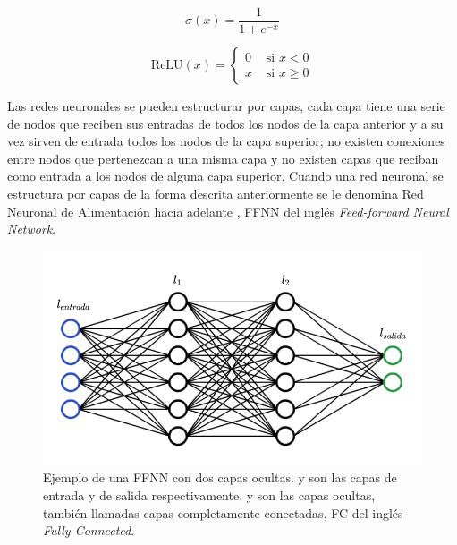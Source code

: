 \begin{equation}
    \label{eq:sigmoid}
    \sigma(x) = \frac{1}{1 + e^{-x}}
\end{equation}

\begin{equation}
    \label{eq:relu}
    \mathrm{ReLU}(x)= \begin{cases} 
        0 & \text { si } x<0 \\
        x & \text { si } x \geq 0
    \end{cases}
\end{equation}

Las redes neuronales se pueden estructurar por capas, cada capa tiene una serie de nodos que reciben sus entradas de todos los nodos de la capa anterior y a su vez sirven de entrada todos los nodos de la capa superior; no existen conexiones entre nodos que pertenezcan a una misma capa y no existen capas que reciban como entrada a los nodos de alguna capa superior. Cuando una red neuronal se estructura por capas de la forma descrita anteriormente se le denomina Red Neuronal de Alimentación hacia adelante \cite{huang2019deep}, FFNN del inglés \textit{Feed-forward Neural Network}. 

\begin{figure}[H]
    \centering
    \includegraphics[scale=0.4]{partes/ImgJoao/nn-capas.png}
    \caption[Ejemplo de una FFNN con dos capas ocultas.]{
        Ejemplo de una FFNN con dos capas ocultas\footnotemark.  y  son las capas de entrada y de salida respectivamente.  y  son las capas ocultas, también llamadas capas completamente conectadas, FC del inglés \textit{Fully Connected}.
    } 
    \label{fig:nn-layers}
\end{figure}


